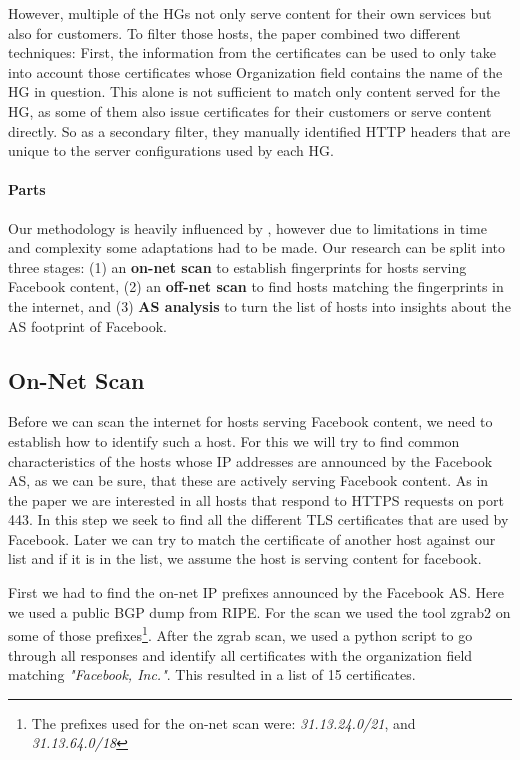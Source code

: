 \documentclass[sigconf,10pt,nonacm]{acmart}
\begin{document}
However, multiple of the HGs not only serve content for their own services but also for customers. To filter those hosts, the paper combined two different techniques: First, the information from the certificates can be used to only take into account those certificates whose Organization field contains the name of the HG in question. This alone is not sufficient to match only content served for the HG, as some of them also issue certificates for their customers or serve content directly. So as a secondary filter, they manually identified HTTP headers that are unique to the server configurations used by each HG.

\paragraph{Parts}

Our methodology is heavily influenced by \cite{gigis_seven_2021}, however due to limitations in time and complexity some adaptations had to be made. Our research can be split into three stages: (1) an \textbf{on-net scan} to establish fingerprints for hosts serving Facebook content, (2) an \textbf{off-net scan} to find hosts matching the fingerprints in the internet, and (3) \textbf{AS analysis} to turn the list of hosts into insights about the AS footprint of Facebook.

\subsection{On-Net Scan}

Before we can scan the internet for hosts serving Facebook content, we need to establish how to identify such a host. For this we will try to find common characteristics of the hosts whose IP addresses are announced by the Facebook AS, as we can be sure, that these are actively serving Facebook content. As in the paper we are interested in all hosts that respond to HTTPS requests on port 443. In this step we seek to find all the different TLS certificates that are used by Facebook. Later we can try to match the certificate of another host against our list and if it is in the list, we assume the host is serving content for facebook.

First we had to find the on-net IP prefixes announced by the Facebook AS. Here we used a public BGP dump from RIPE. For the scan we used the tool zgrab2 on some of those prefixes\footnote{The prefixes used for the on-net scan were: \textit{31.13.24.0/21}, and \textit{31.13.64.0/18}}. After the zgrab scan, we used a python script to go through all responses and identify all certificates with the organization field matching \textit{"Facebook, Inc."}. This resulted in a list of 15 certificates.
\end{document}
